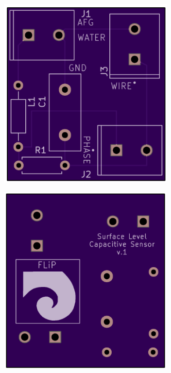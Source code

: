 \begin{figure}[!ht]
\begin{minipage}[c]{0.332149\textwidth}
\begin{subfigure}{\textwidth}
					\includegraphics[width=0.978\textwidth]{Figures/02_06_2025/PCB_Top_borneras.png}
					\captionsetup{width=0.8\textwidth}
					\subcaption{}
				\end{subfigure}
		\end{minipage}\begin{minipage}[c]{0.3321249\textwidth}
		\begin{subfigure}{\textwidth}
			\centering
			\includegraphics[width=0.978\textwidth]{Figures/02_06_2025/PCB_Bottom_borneras}

\end{subfigure}
\end{minipage}
\end{figure}
